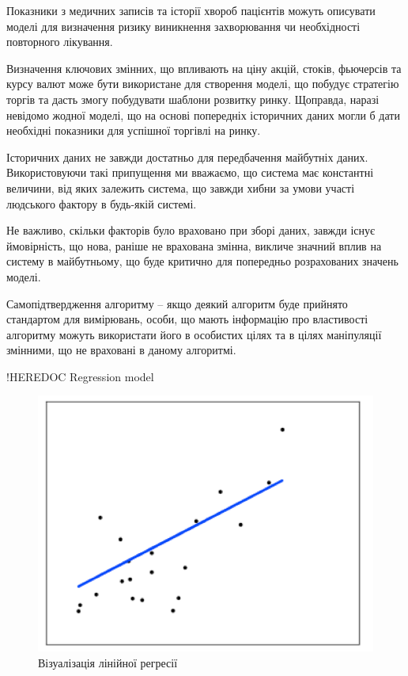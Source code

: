 Показники з медичних записів та історії хвороб пацієнтів можуть описувати моделі для визначення ризику виникнення захворювання чи необхідності повторного лікування.

Визначення ключових змінних, що впливають на ціну акцій, стоків, фьючерсів та курсу валют може бути використане для створення моделі, що побудує стратегію торгів та дасть змогу побудувати шаблони розвитку ринку. Щоправда, наразі невідомо жодної моделі, що на основі попередніх історичних даних могли б дати необхідні показники для успішної торгівлі на ринку.

Історичних даних не завжди достатньо для передбачення майбутніх даних. Використовуючи такі припущення ми вважаємо, що система має константні величини, від яких залежить система, що завжди хибни за умови участі людського фактору в будь-якій системі.

Не важливо, скільки факторів було враховано при зборі даних, завжди існує ймовірність, що нова, раніше не врахована змінна, викличе значний вплив на систему в майбутньому, що буде критично для попередньо розрахованих значень моделі.

Самопідтвердження алгоритму – якщо деякий алгоритм буде прийнято стандартом для вимірювань, особи, що мають інформацію про властивості алгоритму можуть використати його в особистих цілях та в цілях маніпуляції змінними, що не враховані в даному алгоритмі.


!HEREDOC Regression model

\begin{figure}[h!]
  \includegraphics[width=\linewidth]{figures/linear_regression.png}
  \caption{Візуалізація лінійної регресії}
  \label{fig:linear_regression}
\end{figure}

